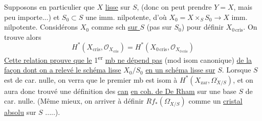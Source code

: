 Supposons en particulier que $X$  \uline{lisse} sur $S$, (donc on peut prendre $Y=X$, mais peu importe...) et $S_0\subset S$ une imm. nilpotente, d'où $X_0=X\times_S S_0\longrightarrow X$ imm. nilpotente. Considérons $X_0$ comme sch \uline{sur $S$} (pas sur $S_0$) pour définir $X_{0\,\mathrm{cris}}$.
On trouve alors
\[
H^*(X_{\mathrm{cris}},\mathcal O_{X_{\mathrm{cris}}})=H^*(X_{0\,\mathrm{cris}},\mathcal O_{X_{0\,\mathrm{cris}}})
\]
\uline{Cette relation prouve que le} 1\textsuperscript{er} \uline{mb ne dépend pas} (mod isom canonique) \uline{de la façon dont on a relevé le schéma lisse} $X_0/S_0$ \uline{en un schéma lisse sur} $S$.
Lorsque $S$ est de car. nulle, on verra que le premier mb est isom à $H^*(X_{\mathrm{zar}},\Omega^{\boldsymbol\cdot}_{X/S})$, et on aura donc trouvé une définition des \uline{} \uline{can} \uline{en coh. de De Rham} sur une base $S$ de car. nulle.
(Même mieux, on   arriver à définir $Rf_*(\Omega^{\boldsymbol\cdot}_{X/S})$ comme un \uline{cristal absolu} sur $S$ .....).
